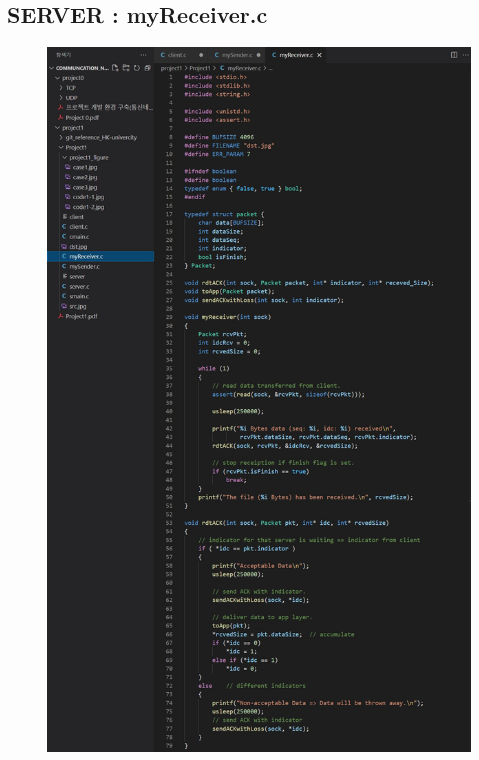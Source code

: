 	\subsection*{SERVER : myReceiver.c}
\vspace{-2mm}
	\begin{figure}[!h]
		\centering
			\includegraphics[width=.9\textwidth]{image/code2-1.jpg}
	\end{figure}
\vspace{-8mm}
\newpage
